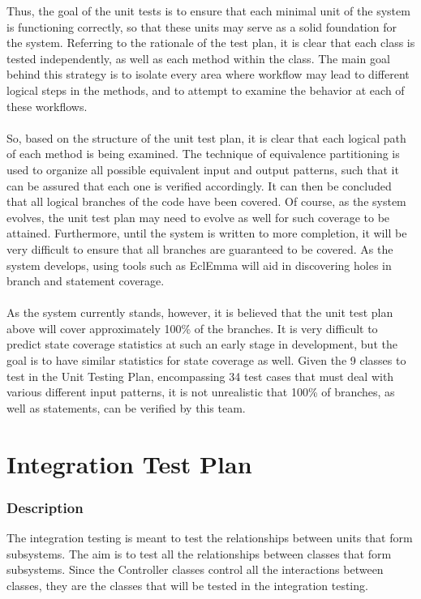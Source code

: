 \documentclass[12pt]{report}
\begin{document}
    Thus, the goal of the unit tests is to ensure that each minimal unit of the system is
    functioning correctly, so that these units may serve as a solid foundation for the system.
    Referring to the rationale of the test plan, it is clear that each class is tested
    independently, as well as each method within the class. The main goal behind this strategy is to
    isolate every area where workflow may lead to different logical steps in the methods, and to
    attempt to examine the behavior at each of these workflows.\\\\
    So, based on the structure of the unit test plan, it is clear that each logical path of each
    method is being examined. The technique of equivalence partitioning is used to organize all
    possible equivalent input and output patterns, such that it can be assured that each one is
    verified accordingly. It can then be concluded that all logical
    branches of the code have been covered. Of course, as the system evolves, the unit test plan may
    need to evolve as well for such coverage to be attained. Furthermore, until the system is
    written to more completion, it will be very difficult to ensure that all branches are guaranteed
    to be covered. As the system develops, using tools such as EclEmma will aid in discovering holes
    in branch and statement coverage.\\\\
    As the system currently stands, however, it is believed that the unit test plan above will cover
    approximately 100\% of the branches. It is very difficult to predict state coverage statistics
    at such an early stage in development, but the goal is to have similar statistics for state
    coverage as well. Given the 9 classes to test in the Unit Testing Plan, encompassing 34 test
    cases that must deal with various different input patterns, it is not unrealistic that 100\% of
    branches, as well as statements, can be verified by this team.
    
\part{Integration Test Plan}
\section{Description}
The integration testing is meant to test the relationships between units that form
subsystems. The aim is to test all the relationships between classes that form subsystems. Since the
Controller classes control all the interactions between classes, they are the classes that will be tested in
the integration testing.
\end{document}
